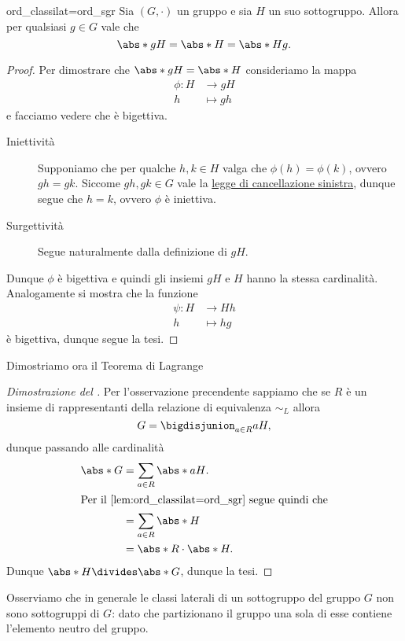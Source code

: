 \begin{lemma}{ord_classilat=ord_sgr}
    Sia $(G, \cdot)$ un gruppo e sia $H$ un suo sottogruppo. Allora per qualsiasi $g \in G$ vale che \[
        \abs*{gH} = \abs*{H} = \abs*{Hg}.
    \]
\end{lemma}
\begin{proof}
    Per dimostrare che $\abs*{gH} = \abs*{H}$ consideriamo la mappa \begin{align*}
        \phi : H &\to gH \\   
        h &\mapsto gh 
    \end{align*} e facciamo vedere che è bigettiva.
    \begin{description}
        \item[Iniettività] Supponiamo che per qualche $h, k \in H$ valga che $\phi(h) = \phi(k)$, ovvero $gh = gk$. Siccome $gh, gk \in G$ vale la \hyperref[prop:prop_grp:canc:sx]{legge di cancellazione sinistra}, dunque segue che $h = k$, ovvero $\phi$ è iniettiva.
        \item[Surgettività] Segue naturalmente dalla definizione di $gH$. 
    \end{description}
    Dunque $\phi$ è bigettiva e quindi gli insiemi $gH$ e $H$ hanno la stessa cardinalità. Analogamente si mostra che la funzione \begin{align*}
        \psi : H &\to Hh \\   
        h &\mapsto hg 
    \end{align*} è bigettiva, dunque segue la tesi.
\end{proof}

Dimostriamo ora il Teorema di Lagrange
\begin{proof}[Dimostrazione del ]
    Per l'osservazione precendente sappiamo che se $R$ è un insieme di rappresentanti della relazione di equivalenza $\sim_L$ allora \[
        G = \bigdisjunion_{a \in R} aH,
    \] dunque passando alle cardinalità \begin{align*}
        \abs*{G} &= \sum_{a \in R} \abs*{aH}.  \\
        \intertext{Per il \Cref{lem:ord_classilat=ord_sgr} segue quindi che}  
        &= \sum_{a \in R} \abs*{H}\\
        &= \abs*{R}\cdot \abs*{H}. 
    \end{align*}  Dunque $\abs*{H} \divides \abs*{G}$, dunque la tesi.
\end{proof}

\begin{remark}
    Osserviamo che in generale le classi laterali di un sottogruppo del gruppo $G$ non sono sottogruppi di $G$: dato che partizionano il gruppo una sola di esse contiene l'elemento neutro del gruppo.
\end{remark}

